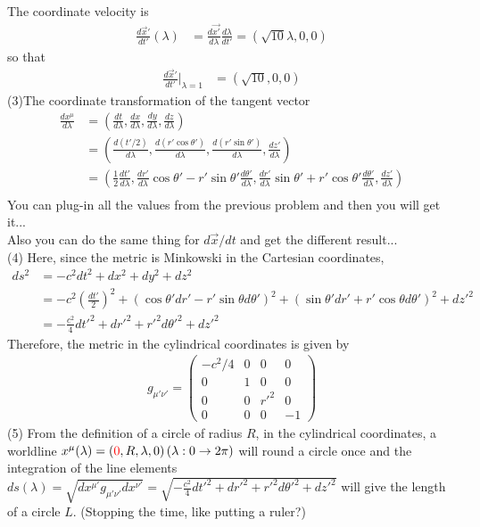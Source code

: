 \documentclass[12pt]{article}
\begin{document}
The coordinate velocity is
\begin{align*}
\frac{d \Vec{x}'}{d t'}(\lambda) &= \frac{d \Vec{x'}}{d \lambda}\frac{d \lambda}{d t'} = \left(\sqrt{10} \lambda, 0, 0\right)
\end{align*}
so that
\begin{align*}
\frac{d \Vec{x}'}{d t'}\bigg|_{\lambda = 1} &= \left(\sqrt{10}, 0, 0\right)
\end{align*}
(3)The coordinate transformation of the tangent vector
\begin{align*}
\frac{d x^{\mu}}{d \lambda} &= \left(\frac{d t}{d \lambda}, \frac{d x}{d \lambda}, \frac{d y}{d \lambda}, \frac{d z}{d \lambda}\right)\\[1em]
&= \left(\frac{d (t'/2)}{d \lambda}, \frac{d (r' \cos{\theta'})}{d \lambda}, \frac{d (r' \sin{\theta'})}{d \lambda}, \frac{d z'}{d \lambda}\right)\\[1em]
&= \left(\frac{1}{2} \frac{d t'}{d \lambda}, \frac{d r'}{d \lambda}\cos{\theta'} - r' \sin{\theta'}\frac{d \theta'}{d \lambda}, \frac{d r'}{d \lambda}\sin{\theta'} + r' \cos{\theta'}\frac{d \theta'}{d \lambda}, \frac{d z'}{d \lambda}\right)\\[1em]
\end{align*}
You can plug-in all the values from the previous problem and then you will get it...\\
Also you can do the same thing for $d \Vec{x} / dt$ and get the different result...\\
(4)
Here, since the metric is Minkowski in the Cartesian coordinates,
\begin{align*}
ds^2 &= -c^2 dt^2 + dx^2 + dy^2 + dz^2\\[1em]
&= -c^2 \left(\frac{dt'}{2}\right)^2 + (\cos{\theta'} dr' -r' \sin{\theta} d \theta')^2 + (\sin{\theta'} dr' + r' \cos{\theta} d \theta')^2 + dz'^2\\[1em]
&= -\frac{c^2}{4} dt'^2 + dr'^2 + r'^2 d\theta'^2 + dz'^2
\end{align*}
Therefore, the metric in the cylindrical coordinates is given by
\begin{gather*}
g_{\mu' \nu'} =
\begin{pmatrix}
-c^2/4 & 0 & 0 & 0 \\
0 & 1 & 0 & 0 \\
0 & 0 & r'^2 & 0 \\
0 & 0 & 0 & -1
\end{pmatrix}
\end{gather*}
(5) From the definition of a circle of radius $R$, in the cylindrical coordinates, a worldline $x^{\mu}(\lambda) = \left({\color{red}0}, R, \lambda, 0\right) \left(\lambda: 0 \rightarrow 2\pi\right)$ will round a circle once and the integration of the line elements $ds(\lambda) =\sqrt{d x^{\mu'} g_{\mu' \nu'} dx^{\nu'}} =\sqrt{-\frac{c^2}{4} dt'^2 + dr'^2 + r'^2 d\theta'^2 + dz'^2}$ will give the length of a circle $L$. ({\color{red}Stopping the time, like putting a ruler?})
\end{document}
